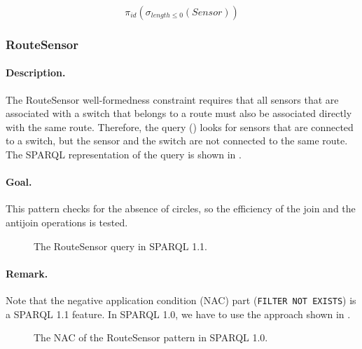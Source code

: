 $$ \pi_{\mathit{id}} \left( \sigma_{\mathit{length} \leq 0} \left( \mathit{Sensor} \right) \right) $$

\subsubsection{RouteSensor}

\paragraph{Description.} The \textsf{RouteSensor} well-formedness constraint requires that all sensors that are associated with a switch that belongs to a route must also be associated directly with the same route. Therefore, the query () looks for sensors that are connected to a switch, but the sensor and the switch are not connected to the same route. The SPARQL representation of the query is shown in .

\paragraph{Goal.} This pattern checks for the absence of circles, so the efficiency of the join and the antijoin operations is tested.

\begin{figure}[htb]
\centering
\begin{minipage}{0.6\textwidth}
  { \alignListing
    }
  \caption{The \textsf{RouteSensor} query in SPARQL 1.1.}
  \label{lst:routesensor-sparql-nac}
\end{minipage}
\end{figure}

\paragraph{Remark.} Note that the negative application condition (NAC) part (\texttt{FILTER NOT EXISTS}) is a SPARQL 1.1 feature. In SPARQL 1.0, we have to use the approach shown in .

\begin{figure}[htb]
\centering
\begin{minipage}{0.6\textwidth}
  { \alignListing
    }
  \caption{The NAC of the \textsf{RouteSensor} pattern in SPARQL 1.0.}
  \label{lst:routesensor-sparql-nac10}
\end{minipage}
\end{figure}

